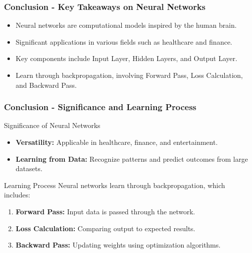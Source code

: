 \documentclass[aspectratio=169]{beamer}
\begin{document}
\begin{frame}[fragile]
    \frametitle{Conclusion - Key Takeaways on Neural Networks}
    \begin{itemize}
        \item Neural networks are computational models inspired by the human brain.
        \item Significant applications in various fields such as healthcare and finance.
        \item Key components include Input Layer, Hidden Layers, and Output Layer.
        \item Learn through backpropagation, involving Forward Pass, Loss Calculation, and Backward Pass.
    \end{itemize}
\end{frame}

\begin{frame}[fragile]
    \frametitle{Conclusion - Significance and Learning Process}
    \begin{block}{Significance of Neural Networks}
        \begin{itemize}
            \item \textbf{Versatility:} Applicable in healthcare, finance, and entertainment.
            \item \textbf{Learning from Data:} Recognize patterns and predict outcomes from large datasets.
        \end{itemize}
    \end{block}

    \begin{block}{Learning Process}
        Neural networks learn through backpropagation, which includes:
        \begin{enumerate}
            \item \textbf{Forward Pass:} Input data is passed through the network.
            \item \textbf{Loss Calculation:} Comparing output to expected results.
            \item \textbf{Backward Pass:} Updating weights using optimization algorithms.
        \end{enumerate}
    \end{block}
\end{frame}
\end{document}
